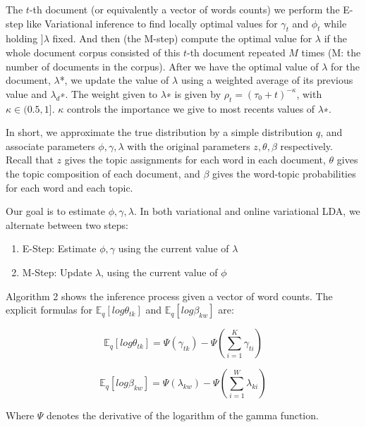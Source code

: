 \documentclass[12pt]{report}
\begin{document}
The $t$-th document (or equivalently a vector of words counts) we perform the
E-step like Variational inference to find locally optimal values for $\gamma_t$
and $\phi_t$ while holding $]\lambda$ fixed. And then (the M-step) compute the
optimal value for $\lambda$ if the whole document corpus consisted of this
$t$-th document repeated $M$ times (M: the number of documents in the corpus).
After we have the optimal value of $\lambda$ for the   document, $\lambda$*, we
update the value of $\lambda$ using a weighted average of its previous value and
$\lambda_d$∗. The weight given to $\lambda$∗ is given by 
$\rho_t = (\tau_{0} + t)^{-\kappa}$, with $\kappa \in (0.5, 1]$. 
$\kappa$ controls the importance we give to most recents values of $\lambda$∗.

In short, we approximate the true distribution by a simple distribution $q$, and
associate parameters $\phi,\gamma,\lambda$ with the original parameters $z,\theta,
\beta$ respectively. Recall that $z$ gives the topic assignments for each
word in each document, $\theta$ gives the topic composition of each document, 
and $\beta$ gives the word-topic probabilities for each word and each topic.

Our goal is to estimate $\phi, \gamma, \lambda$. In both variational 
and online variational LDA, we alternate between two steps:

\begin{enumerate}
\item E-Step: Estimate $\phi, \gamma$ using the current value of $\lambda$
\item M-Step: Update $\lambda$, using the current value of $\phi$
\end{enumerate}

Algorithm 2 shows the inference process given a vector of word counts. The
explicit formulas for $\mathbb{E}_q[log \theta_{tk}]$ and $\mathbb{E}_q[log
\beta_{kw}]$ are:

\begin{equation}
\mathbb{E}_q[log \theta_{tk}] = \Psi(\gamma_{tk}) - \Psi(\sum_{i=1}^K \gamma_{ti})
\end{equation}

\begin{equation}
\mathbb{E}_q[log \beta_{kw}] = \Psi(\lambda_{kw}) - \Psi(\sum_{i=1}^W \lambda_{ki})
\end{equation}

Where $\Psi$ denotes the derivative of the logarithm of the gamma function.
\end{document}
